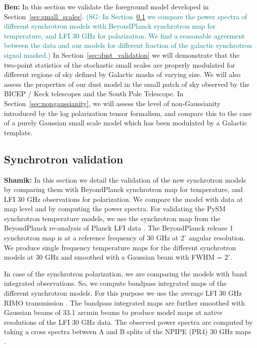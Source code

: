 \documentclass[twocolumn]{aastex631}
\newcommand{\sg}[1]{\textcolor{teal}{(SG: #1)}}
\begin{document}
\textbf{Ben:} In this section we validate the foreground model developed in Section~\ref{sec:small_scales}. \sg{In Section~\ref{sec:sync_validation} we compare the power spectra of different synchrotron models with BeyondPlanck synchrotron map for temperature, and LFI 30 GHz for polarization. We find a reasonable agreement between the data and our models for different fraction of the galactic synchrotron signal masked.} In Section~\ref{sec:dust_validation} we will demonstrate that the two-point statistics of the stochastic small scales are properly modulated for different regions of sky defined by Galactic masks of varying size. We will also assess the properties of our dust model in the small patch of sky observed by the BICEP / Keck telescopes and the South Pole Telescope. In Section~\ref{sec:nongaussianity}, we will assess the level of non-Gaussianity introduced by the log polarization tensor formalism, and compare this to the case of a purely Gaussian small scale model which has been modulated by a Galactic template. 

\subsection{Synchrotron validation} \label{sec:sync_validation}
\textbf{Shamik:} In this section we detail the validation of the new synchrotron models by comparing them with BeyondPlanck synchrotron map for temperature, and LFI 30 GHz observations for polarization. We compare the model with data at map level and by computing the power spectra. For validating the PySM synchrotron temperature models, we use the synchrotron map from the BeyondPlanck re-analysis of Planck LFI data \citep{2022arXiv220108188A}. The BeyondPlanck release 1 synchrotron map is at a reference frequency of 30 GHz at $2^\circ$ angular resolution. We produce single frequency temperature maps for the different synchrotron models at 30 GHz and smoothed with a Gaussian beam with FWHM = $2^\circ$.

In case of the synchrotron polarization, we are comparing the models with band integrated observations. So, we compute bandpass integrated maps of the different synchrotron models. For this purpose we use the average LFI 30 GHz RIMO transmission \citep{planck2014-a03}. The bandpass integrated maps are further smoothed with Gaussian beams of 33.1 arcmin beams to produce model maps at native resolutions of the LFI 30 GHz data. The observed power spectra are computed by taking a cross spectra between A and B splits of the NPIPE (PR4) 30 GHz maps \citep{planck2020-LVII}.
\end{document}
